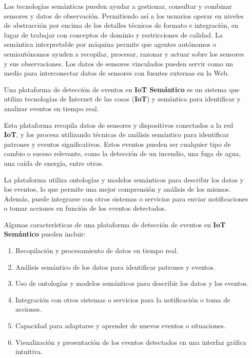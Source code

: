 \documentclass[12pt]{article}
\begin{document}
Las tecnologías semánticas pueden ayudar a gestionar, consultar y combinar sensores y datos de observación. Permitiendo así a los usuarios operar en niveles de abstracción por encima de los detalles técnicos de formato e integración, en lugar de trabajar con conceptos de dominio y restricciones de calidad. La semántica interpretable por máquina permite que agentes autónomos o semiautónomos ayuden a recopilar, procesar, razonar y actuar sobre los sensores y sus observaciones. Los datos de sensores vinculados pueden servir como un medio para interconectar datos de sensores con fuentes externas en la Web\citep{ref12}.

Una plataforma de detección de eventos en \textbf{IoT Semántico} es un sistema que utiliza tecnologías de Internet de las cosas (\textbf{IoT}) y semántica para identificar y analizar eventos en tiempo real.

Esta plataforma recopila datos de sensores y dispositivos conectados a la red \textbf{IoT}, y los procesa utilizando técnicas de análisis semántico para identificar patrones y eventos significativos. Estos eventos pueden ser cualquier tipo de cambio o suceso relevante, como la detección de un incendio, una fuga de agua, una caída de energía, entre otros.

La plataforma utiliza ontologías y modelos semánticos para describir los datos y los eventos, lo que permite una mejor comprensión y análisis de los mismos. Además, puede integrarse con otros sistemas o servicios para enviar notificaciones o tomar acciones en función de los eventos detectados.

Algunas características de una plataforma de detección de eventos en \textbf{IoT Semántico} pueden incluir:

\begin{enumerate}
    \item {
        
        Recopilación y procesamiento de datos en tiempo real.
    }
    \item {
       
        Análisis semántico de los datos para identificar patrones y eventos.
    }
    \item {
        Uso de ontologías y modelos semánticos para describir los datos y los eventos.
    }
    \item {
        Integración con otros sistemas o servicios para la notificación o toma de acciones.
    }
    \item {
        Capacidad para adaptarse y aprender de nuevos eventos o situaciones.
    }
    \item {
        Visualización y presentación de los eventos detectados en una interfaz gráfica intuitiva.
    }
        
\end{enumerate}
\end{document}
